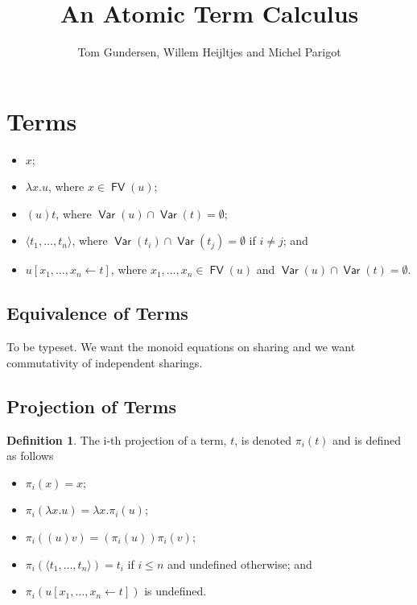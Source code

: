 \documentclass[11pt,a4paper]{article}
\title{An Atomic Term Calculus}
\author{Tom Gundersen, Willem Heijltjes and Michel Parigot}
\theoremstyle{definition}
\newtheorem{definition}{Definition}
\theoremstyle{plain}
\theoremstyle{remark}
\begin{document}
\maketitle


\section{Terms}

\newcommand{\FV}{{\mathop{\mathsf{FV}}}}
\newcommand{\Var}{{\mathop{\mathsf{Var}}}}
\newcommand{\tertuple}[2]{{\langle{#1},\dots,{#2}{\rangle}}}
\newcommand{\tershare}[4]{{{#1}[{#2},\dots,{#3}\leftarrow{#4}]}}
\newcommand{\terpr}[2]{{\pi_{#1}({#2})}}

\begin{itemize}
	\item $x$;
	\item $\lambda x.u$, where $x\in\FV(u)$;
	\item $(u)t$, where $\Var(u)\cap\Var(t)=\emptyset$;
	\item $\tertuple{t_1}{t_n}$, where $\Var(t_i)\cap\Var(t_j)=\emptyset$ if $i\neq j$; and
	\item $\tershare{u}{x_1}{x_n}{t}$, where $x_1,\dots,x_n\in\FV(u)$ and $\Var(u)\cap\Var(t)=\emptyset$.
\end{itemize}

\subsection{Equivalence of Terms}

To be typeset. We want the monoid equations on sharing and we want commutativity of independent sharings.

\subsection{Projection of Terms}

\begin{definition}
	The i-th projection of a term, $t$, is denoted $\terpr{i}{t}$ and is defined as follows
	\begin{itemize}
		\item $\terpr{i}{x}=x$;
		\item $\terpr{i}{\lambda x.u}=\lambda x.\terpr{i}{u}$;
		\item $\terpr{i}{(u)v}=(\terpr{i}{u})\terpr{i}{v}$;
		\item $\terpr{i}{\tertuple{t_1}{t_n}}=t_i$ if $i\leq n$ and undefined otherwise; and
		\item $\terpr{i}{\tershare{u}{x_1}{x_n}{t}}$ is undefined.
	\end{itemize}
\end{definition}
\end{document}
